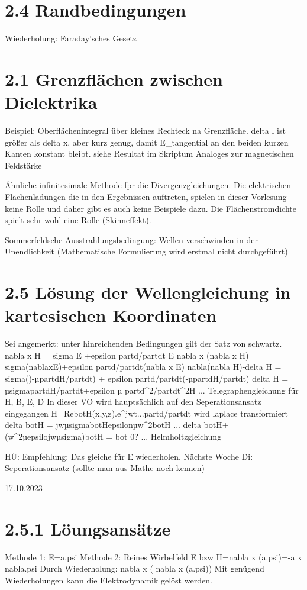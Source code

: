 \documentclass[a4paper]{article}
\begin{document}
\section{2.4 Randbedingungen}
Wiederholung: Faraday'sches Gesetz

\section{2.1 Grenzflächen zwischen Dielektrika}
Beispiel: Oberflächenintegral über kleines Rechteck na Grenzfläche.
        delta l ist größer als delta x, aber kurz genug, damit E_tangential an
        den beiden kurzen Kanten konstant bleibt.
    siehe Resultat im Skriptum
Analoges zur magnetischen Feldstärke

Ähnliche infinitesimale Methode fpr die Divergenzgleichungen.
Die elektrischen Flächenladungen die in den Ergebnissen auftreten, spielen in
dieser Vorlesung keine Rolle und daher gibt es auch keine Beispiele dazu.
Die Flächenstromdichte spielt sehr wohl eine Rolle (Skinneffekt).

Sommerfeldsche Ausstrahlungsbedingung: Wellen verschwinden in der Unendlichkeit
        (Mathematische Formulierung wird erstmal nicht durchgeführt)

\section{2.5 Lösung der Wellengleichung in kartesischen Koordinaten}
Sei angemerkt: unter hinreichenden Bedingungen  gilt der Satz von schwartz.
nabla x H = sigma E +epsilon partd/partdt E
nabla x (nabla x H) = sigma(nablaxE)+epsilon partd/partdt(nabla x E)
nabla(nabla H)-delta H = sigma()-µpartdH/partdt) + epsilon partd/partdt(-µpartdH/partdt)
delta H = µsigmapartdH/partdt+epsilon µ partd^2/partdt^2H          ... Telegraphengleichung für H, B, E, D
In dieser VO wird hauptsächlich auf den Seperationsansatz eingegangen
H=Re{botH(x,y,z).e^jwt}...partd/partdt wird laplace transformiert
delta botH = jwµsigmabotHepsilonµw^2botH ... delta botH+(w^2µepsilojwµsigma)botH = bot 0? ... Helmholtzgleichung

HÜ: Empfehlung: Das gleiche für E wiederholen.
Nächste Woche Di: Seperationsansatz (sollte man aus Mathe noch kennen)

17.10.2023
\section{2.5.1 Löungsansätze}
Methode 1: E=a.psi
Methode 2:
    Reines Wirbelfeld E bzw H=nabla x (a.psi)=-a x nabla.psi
    Durch Wiederholung: nabla x ( nabla x (a.psi))
    Mit genügend Wiederholungen kann die Elektrodynamik gelöst werden.
\end{document}
